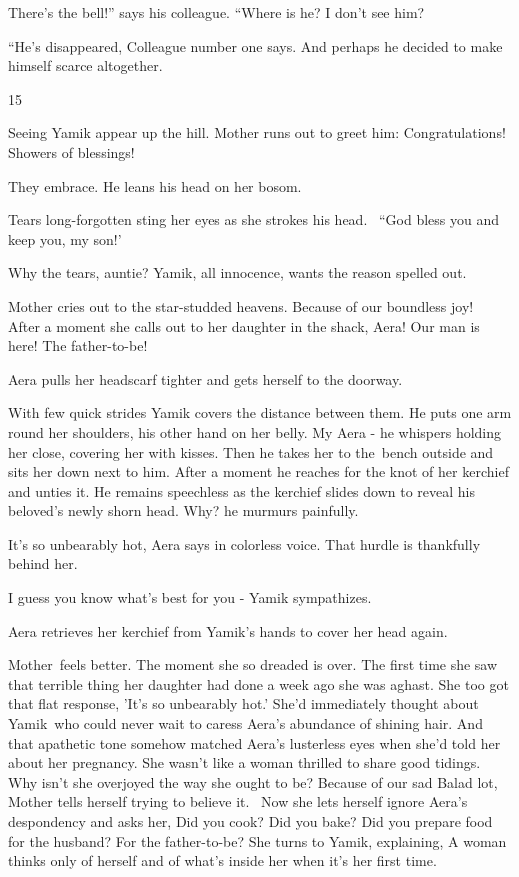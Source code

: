 \documentclass[twoside,11pt]{book}
\begin{document}
{\textquotedbl}There's the bell!'' says his colleague. ``Where is he? I don't see him?{\textquotedbl} 

{}``He's disappeared,{\textquotedbl} Colleague number one says. {\textquotedbl}And perhaps he decided to make himself
scarce altogether.{\textquotedbl}


\bigskip

15~~

Seeing Yamik appear up the hill. Mother runs out to greet him: {\textquotedbl}Congratulations! Showers of
blessings!{\textquotedbl} \ 

They embrace. He leans his head on her bosom.

Tears long-forgotten sting her eyes as she strokes his head. \ {}``God bless you and keep you, my son!' 

{\textquotedbl}Why the tears, auntie?{\textquotedbl} Yamik, all innocence, wants the reason spelled out. 

Mother cries out to the star-studded heavens. {\textquotedbl}Because of our boundless joy!{\textquotedbl}~ After a
moment she calls out to her daughter in the shack, {\textquotedbl}Aera! Our man is here! The
father-to-be!{\textquotedbl}

Aera pulls her headscarf tighter and gets herself to the doorway.

With few quick strides Yamik covers the distance between them. He puts one arm round her shoulders, his other hand on
her belly. {\textquotedbl}My Aera -{\textquotedbl} he whispers holding her close, covering her with kisses. Then he
takes her to the~bench outside and sits her down next to him. After a moment he reaches for the knot of her kerchief
and unties it. He remains speechless as the kerchief slides down to reveal his beloved{}'s newly shorn head.
{\textquotedbl}Why?{\textquotedbl} he murmurs painfully. 

{\textquotedbl}It's so unbearably hot,{\textquotedbl} Aera says in colorless voice. That hurdle is thankfully behind
her. 

{\textquotedbl}I guess you know what's best for you -{\textquotedbl} Yamik sympathizes. 

Aera retrieves her kerchief from Yamik's hands to cover her head again.\ 

Mother~feels better. The moment she so dreaded is over. The first time she saw that terrible thing her daughter had done
a week ago she was aghast. She too got that flat response, 'It's so unbearably hot.' She'd immediately thought about
Yamik~who could never wait to caress Aera's abundance of shining hair. And that apathetic tone somehow matched Aera's
lusterless eyes when she'd told her about her pregnancy. She wasn't like a woman thrilled to share good tidings. Why
isn't she overjoyed the way she ought to be? Because of our sad Balad lot, Mother tells herself trying to believe it.
\ Now she lets herself ignore Aera's despondency and asks her, {\textquotedbl}Did you cook? Did you bake? Did you
prepare food for the husband? For the father-to-be?{\textquotedbl} She turns to Yamik, explaining, {\textquotedbl}A
woman thinks only of herself and of what's inside her when it's her first time.{\textquotedbl}
\end{document}
